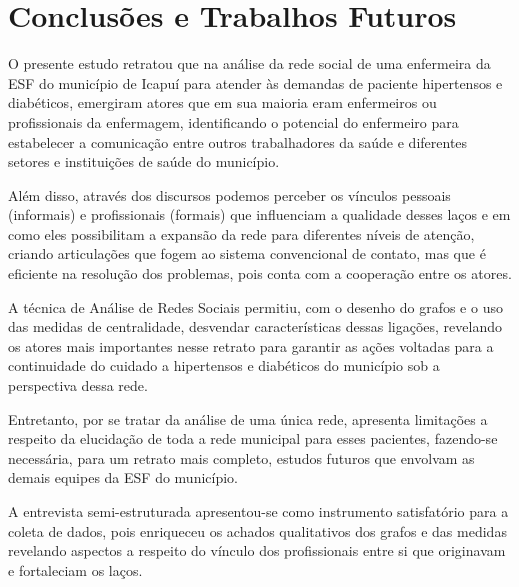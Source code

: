 \chapter{Conclusões e Trabalhos Futuros}
\label{chap:conclusoes-e-trabalhos-futuros}

O presente estudo retratou que na análise da rede social de uma enfermeira da ESF do município de Icapuí para atender às demandas de paciente hipertensos e diabéticos, emergiram atores que em sua maioria eram enfermeiros ou profissionais da enfermagem, identificando o potencial do enfermeiro para estabelecer a comunicação entre outros trabalhadores da saúde e diferentes setores e instituições de saúde do município. 

Além disso, através dos discursos podemos perceber os vínculos pessoais (informais) e profissionais (formais) que influenciam a qualidade desses laços e em como eles possibilitam a expansão da rede para diferentes níveis de atenção, criando articulações que fogem ao sistema convencional de contato, mas que é eficiente na resolução dos problemas, pois conta com a cooperação entre os atores.

A técnica de Análise de Redes Sociais permitiu, com o desenho do grafos e o uso das medidas de centralidade, desvendar características dessas ligações, revelando os atores mais importantes nesse retrato para garantir as ações voltadas para a continuidade do cuidado a hipertensos e diabéticos do município sob a perspectiva dessa rede. 

Entretanto, por se tratar da análise de uma única rede, apresenta limitações a respeito da elucidação de toda a rede municipal para esses pacientes, fazendo-se necessária, para um retrato mais completo, estudos futuros que envolvam as demais equipes da ESF do município. 

A entrevista semi-estruturada apresentou-se como instrumento satisfatório para a coleta de dados, pois enriqueceu os achados qualitativos dos grafos e das medidas revelando aspectos a respeito do vínculo dos profissionais entre si que originavam e fortaleciam os laços. 




